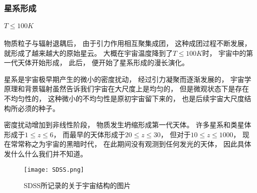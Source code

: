 \documentclass[8pt]{beamer}
\begin{document}
        \begin{frame}[fragile]
            \frametitle{星系形成}
            \framesubtitle{$T\leqslant 100K$}
            \begin{multicols}{2} 
                \qquad
                物质粒子与辐射退耦后，
                由于引力作用相互聚集成团，
                这种成团过程不断发展，
                就形成了越来越大的原始星云。
                大概在宇宙温度降到了$T\leqslant 100K$时，
                宇宙中的第一代天体开始形成，
                此后，
                便开始了星系形成的漫长演化。

                \qquad
                星系是宇宙极早期产生的微小的密度扰动，
                经过引力凝聚而逐渐发展的，
                宇宙学原理和背景辐射虽然告诉我们宇宙在大尺度上是均匀的，
                但是微观状态下是存在不均匀性的，
                这种微小的不均匀性是原初宇宙留下来的，
                也是后续宇宙大尺度结构所必须的种子。

                \qquad
                密度扰动增加到非线性阶段，
                物质发生坍缩形成第一代天体。
                许多星系和类星体形成于$1\leqslant z\leqslant6$，
                而最早的天体形成于$20\leqslant z\leqslant30$，
                但对于$10\leqslant z\leqslant1000$，
                现在常常称之为宇宙的黑暗时代，
                在此期间没有观测到任何发光的天体，
                因此具体发什么什么我们并不知道。
                \begin{figure}[h]
                    \centering
                    \texttt{[image: SDSS.png]}  
                    \caption{SDSS所记录的关于宇宙结构的图片}
                \end{figure}
            \end{multicols}
        \end{frame}
    
\end{document}
